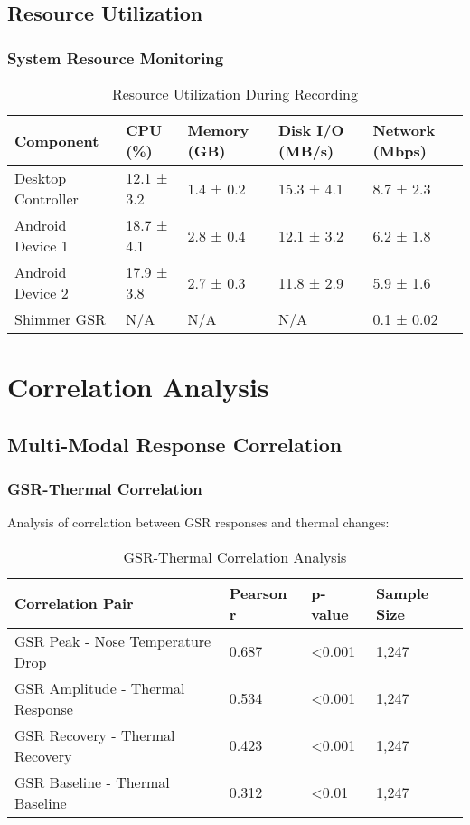 \subsection{Resource Utilization}

\subsubsection{System Resource Monitoring}

\begin{table}[htbp]
\centering
\caption{Resource Utilization During Recording}
\begin{tabular}{|l|l|l|l|l|}
\hline
\textbf{Component} & \textbf{CPU (\%)} & \textbf{Memory (GB)} & \textbf{Disk I/O (MB/s)} & \textbf{Network (Mbps)} \\
\hline
Desktop Controller & 12.1 ± 3.2 & 1.4 ± 0.2 & 15.3 ± 4.1 & 8.7 ± 2.3 \\
Android Device 1 & 18.7 ± 4.1 & 2.8 ± 0.4 & 12.1 ± 3.2 & 6.2 ± 1.8 \\
Android Device 2 & 17.9 ± 3.8 & 2.7 ± 0.3 & 11.8 ± 2.9 & 5.9 ± 1.6 \\
Shimmer GSR & N/A & N/A & N/A & 0.1 ± 0.02 \\
\hline
\end{tabular}
\end{table}

\section{Correlation Analysis}

\subsection{Multi-Modal Response Correlation}

\subsubsection{GSR-Thermal Correlation}

Analysis of correlation between GSR responses and thermal changes:

\begin{table}[htbp]
\centering
\caption{GSR-Thermal Correlation Analysis}
\begin{tabular}{|l|l|l|l|}
\hline
\textbf{Correlation Pair} & \textbf{Pearson r} & \textbf{p-value} & \textbf{Sample Size} \\
\hline
GSR Peak - Nose Temperature Drop & 0.687 & <0.001 & 1,247 \\
GSR Amplitude - Thermal Response & 0.534 & <0.001 & 1,247 \\
GSR Recovery - Thermal Recovery & 0.423 & <0.001 & 1,247 \\
GSR Baseline - Thermal Baseline & 0.312 & <0.01 & 1,247 \\
\hline
\end{tabular}
\end{table}

